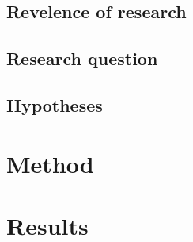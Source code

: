 \documentclass[10pt, a4paper, titlepage]{article}
\begin{document}
\subsection{Revelence of research}

\subsection{Research question}

\subsection{Hypotheses}

\section{Method}


\section{Results}

\newpage


\end{document}
